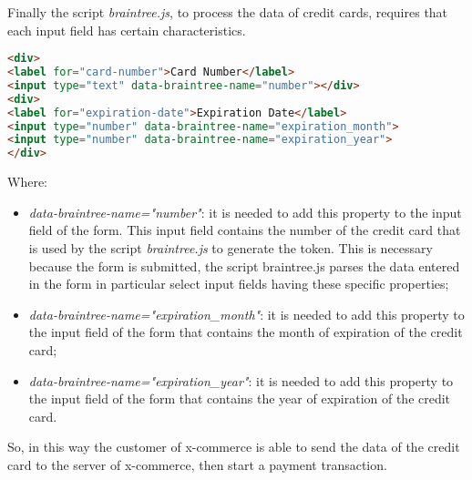 Finally the script \emph{braintree.js}, to process the data of credit cards, requires that each input field has certain characteristics.
\begin{lstlisting}[language=html]
<div>
<label for="card-number">Card Number</label>
<input type="text" data-braintree-name="number"></div>
<div>
<label for="expiration-date">Expiration Date</label>
<input type="number" data-braintree-name="expiration_month">
<input type="number" data-braintree-name="expiration_year">
</div>
\end{lstlisting}
Where:
\begin{itemize}
\item \emph{data-braintree-name="number"}: it is needed to add this property to the input field of the form. This input field contains the number of the credit card that is used by the script \emph{braintree.js} to generate the token. This is necessary because the form is submitted, the script braintree.js parses the data entered in the form in particular select input fields having these specific properties;
\item \emph{data-braintree-name="expiration\_month"}: it is needed to add this property to the input field of the form that contains the month of expiration of the credit card;
\item \emph{data-braintree-name="expiration\_year"}: it is needed to add this property to the input field of the form that contains the year of expiration of the credit card.
\end{itemize}
So, in this way the customer of x-commerce is able to send the data of the credit card to the server of x-commerce, then start a payment transaction.
